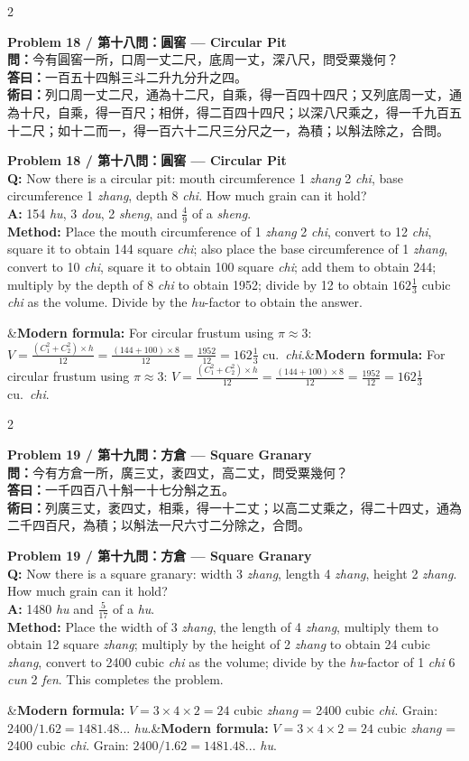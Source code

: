 \documentclass[11pt,a4paper]{article}
\newcommand{\bilingualproblem}[4]{%
  \begin{paracol}{2}
  \begin{leftcolumn}
  \noindent\textbf{\color{problemcolor}#1}\\[0.2cm]
  #2
  \end{leftcolumn}
  \switchcolumn
  \noindent\textbf{\color{problemcolor}#1}\\[0.2cm]
  #3
  \end{paracol}
  \ifx&#4&\else\vspace{0.3cm}\noindent#4\fi
  \vspace{0.5cm}
}
\newcommand{\wen}[1]{\textcolor{problemcolor}{\textbf{問：}}#1}
\newcommand{\da}[1]{\textcolor{answercolor}{\textbf{答曰：}}#1}
\newcommand{\shu}[1]{\textcolor{methodcolor}{\textbf{術曰：}}#1}
\newcommand{\wenen}[1]{\textcolor{problemcolor}{\textbf{Q:}} #1}
\newcommand{\daen}[1]{\textcolor{answercolor}{\textbf{A:}} #1}
\newcommand{\shuen}[1]{\textcolor{methodcolor}{\textbf{Method:}} #1}
\begin{document}
\bilingualproblem{Problem 18 / 第十八問：圓窖 --- Circular Pit}{
\wen{今有圓窖一所，口周一丈二尺，底周一丈，深八尺，問受粟幾何？}\\[0.2cm]
\da{一百五十四斛三斗二升九分升之四。}\\[0.2cm]
\shu{列口周一丈二尺，通為十二尺，自乘，得一百四十四尺；又列底周一丈，通為十尺，自乘，得一百尺；相併，得二百四十四尺；以深八尺乘之，得一千九百五十二尺；如十二而一，得一百六十二尺三分尺之一，為積；以斛法除之，合問。}
}{
\wenen{Now there is a circular pit: mouth circumference 1 \textit{zhang} 2 \textit{chi}, base circumference 1 \textit{zhang}, depth 8 \textit{chi}. How much grain can it hold?}\\[0.2cm]
\daen{154 \textit{hu}, 3 \textit{dou}, 2 \textit{sheng}, and $\frac{4}{9}$ of a \textit{sheng}.}\\[0.2cm]
\shuen{Place the mouth circumference of 1 \textit{zhang} 2 \textit{chi}, convert to 12 \textit{chi}, square it to obtain 144 square \textit{chi}; also place the base circumference of 1 \textit{zhang}, convert to 10 \textit{chi}, square it to obtain 100 square \textit{chi}; add them to obtain 244; multiply by the depth of 8 \textit{chi} to obtain 1952; divide by 12 to obtain $162\frac{1}{3}$ cubic \textit{chi} as the volume. Divide by the \textit{hu}-factor to obtain the answer.}
}{\textbf{Modern formula:} For circular frustum using $\pi \approx 3$: $V = \frac{(C_1^2 + C_2^2) \times h}{12} = \frac{(144+100) \times 8}{12} = \frac{1952}{12} = 162\frac{1}{3}$ cu.\ \textit{chi}.}

\newpage

\bilingualproblem{Problem 19 / 第十九問：方倉 --- Square Granary}{
\wen{今有方倉一所，廣三丈，袤四丈，高二丈，問受粟幾何？}\\[0.2cm]
\da{一千四百八十斛一十七分斛之五。}\\[0.2cm]
\shu{列廣三丈，袤四丈，相乘，得一十二丈；以高二丈乘之，得二十四丈，通為二千四百尺，為積；以斛法一尺六寸二分除之，合問。}
}{
\wenen{Now there is a square granary: width 3 \textit{zhang}, length 4 \textit{zhang}, height 2 \textit{zhang}. How much grain can it hold?}\\[0.2cm]
\daen{1480 \textit{hu} and $\frac{5}{17}$ of a \textit{hu}.}\\[0.2cm]
\shuen{Place the width of 3 \textit{zhang}, the length of 4 \textit{zhang}, multiply them to obtain 12 square \textit{zhang}; multiply by the height of 2 \textit{zhang} to obtain 24 cubic \textit{zhang}, convert to 2400 cubic \textit{chi} as the volume; divide by the \textit{hu}-factor of 1 \textit{chi} 6 \textit{cun} 2 \textit{fen}. This completes the problem.}
}{\textbf{Modern formula:} $V = 3 \times 4 \times 2 = 24$ cubic \textit{zhang} = 2400 cubic \textit{chi}. Grain: $2400 / 1.62 = 1481.48...$ \textit{hu}.}
\end{document}
